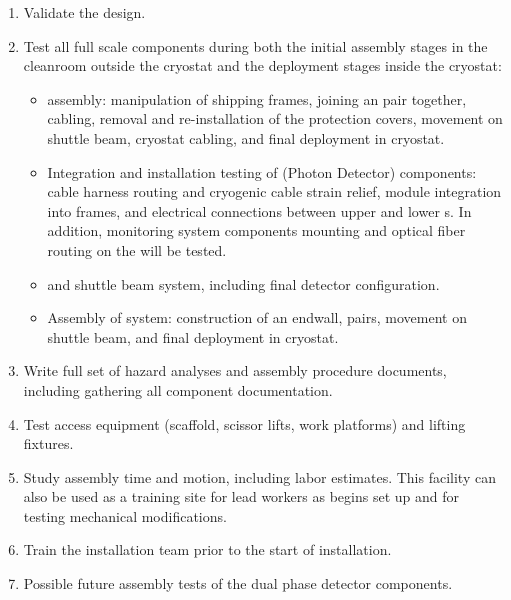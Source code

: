 \begin{enumerate}
\item Validate the  design. 
\item Test all full scale  components during both the initial assembly stages in the cleanroom outside the cryostat and the deployment stages inside the cryostat:  
\begin{itemize}
    \item {}  assembly: manipulation of  shipping frames, joining an  pair together,  cabling, removal and re-installation of the  protection covers, movement on shuttle beam, cryostat cabling, and final deployment in cryostat. 
    \item Integration and installation testing of  (Photon Detector) components: cable harness routing and cryogenic cable strain relief, module integration into  frames, and electrical connections between upper and lower s.  In addition,  monitoring system components mounting and optical fiber routing on the  will be tested.
    \item {} and shuttle beam system, including final detector configuration.
    \item Assembly of  system: construction of an endwall,  pairs, movement on shuttle beam, and final deployment in cryostat.
\end{itemize}
\item Write full set of hazard analyses and assembly procedure documents, including gathering all component documentation. 
\item Test access equipment (scaffold, scissor lifts, work platforms) and lifting fixtures. 
\item Study assembly time and motion, including labor estimates. This facility can also be used as a training site for lead workers as  begins set up and for testing mechanical modifications.
\item Train the installation team prior to the start of  installation. 
\item Possible future assembly tests of the dual phase detector components.
\end{enumerate}


